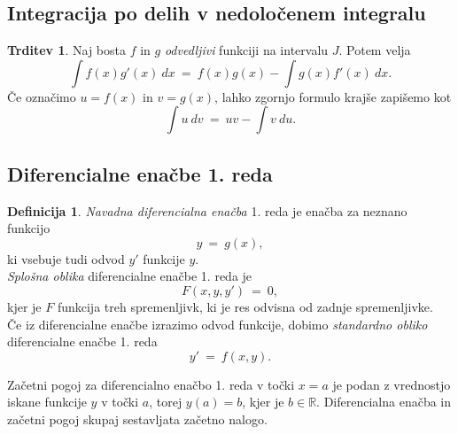 \documentclass[11pt]{article}
\theoremstyle{definition}
\newtheorem{definicija}{Definicija}[section]
\theoremstyle{definition}
\newtheorem{trditev}{Trditev}[section]
\theoremstyle{definition}
\theoremstyle{theorem}
\begin{document}
\subsection{Integracija po delih v nedoločenem integralu}
\vspace{0.5cm}

\begin{trditev}

Naj bosta $f$ in $g$ \textit{odvedljivi} funkciji na intervalu $J$. Potem velja
$$\int f(x) g'(x)~dx ~=~ f(x) g(x) - \int g(x) f'(x)~dx.$$
Če označimo $u = f(x)$ in $v = g(x)$, lahko zgornjo formulo krajše zapišemo kot
$$\int u~dv ~=~ uv - \int v~du.$$

\end{trditev}
\vspace{0.5cm}

\pagebreak


\subsection{Diferencialne enačbe 1. reda}
\vspace{0.5cm}

\begin{definicija}

\textit{Navadna diferencialna enačba} 1. reda je enačba za neznano funkcijo 
$$y~=~g(x),$$
ki vsebuje tudi odvod $y'$ funkcije $y$. \\

\noindent \textit{Splošna oblika} diferencialne enačbe 1. reda je
$$F(x,y,y')~=~0,$$
kjer je $F$ funkcija treh spremenljivk, ki je res odvisna od zadnje spremenljivke. \\

\noindent Če iz diferencialne enačbe izrazimo odvod funkcije, dobimo \textit{standardno obliko} diferencialne enačbe 1. reda
$$y' ~=~ f(x,y).$$

\noindent Začetni pogoj za diferencialno enačbo 1. reda v točki $x = a$ je podan z vrednostjo iskane funkcije $y$ v točki $a$, torej $y(a) = b$, kjer je $b \in \mathbb{R}$. Diferencialna enačba in začetni pogoj skupaj sestavljata začetno nalogo.

\end{definicija}
\vspace{0.5cm}
\end{document}
